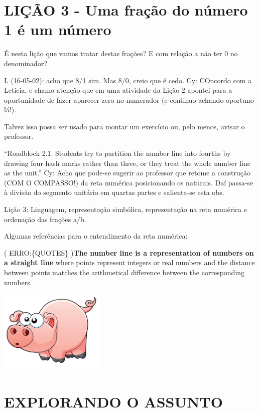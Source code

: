 \documentclass[a4,12pt]{book}
\newcounter{atividade}
\begin{document}
\section*{ LIÇÃO 3 - Uma fração do número 1 é um número }




É nesta lição que vamos tratar destas frações? E com relação a não ter $0$ no denominador?

L (16-05-02): acho que 8/1 sim. Mas 8/0, creio que é cedo.
Cy: COncordo com a Leticia, e chamo atenção que em uma atividade da Lição 2 apontei para a oportunidade de fazer aparecer zero no numerador (e continuo achando oportuno lá!).




Talvez isso possa ser usado para montar um exercício ou, pelo menos, avisar o professor.

``Roadblock 2.1. Students try to partition the number line into fourths by drawing four hash marks rather than three, or they treat the whole number line as the unit.''
Cy: Acho que pode-se sugerir ao professor que retome a construção (COM O COMPASSO!) da reta numérica posicionando os naturais. Daí passa-se à divisão do segmento unitário em quartas partes e salienta-se esta obs.






Lição 3: Linguagem, representação simbólica, representação na reta numérica e ordenação das frações a/b.

\mbox{} \newline Algumas referências para o entendimento da reta numérica:

( ERRO:\{QUOTES\} ){\bf The number line is a representation of numbers on a straight line} where points represent integers or real numbers and the distance between points matches the arithmetical difference between the corresponding numbers.

\includegraphics[width=\textwidth,height=4cm, keepaspectratio]{pig}
\section*{ EXPLORANDO O ASSUNTO }
\end{document}
